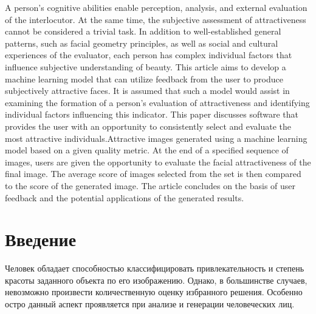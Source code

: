 \documentclass[60x84/16,8pt]{ittmm}
\begin{document}


\begin{altabstract}
A person's cognitive abilities enable perception, analysis, and external evaluation of the interlocutor.
At the same time, the subjective assessment of attractiveness cannot be considered a trivial task.
In addition to well-established general patterns, such as facial geometry principles, as well as social and cultural experiences of the evaluator,
each person has complex individual factors that influence subjective understanding of beauty.
This article aims to develop a machine learning model that can utilize feedback from the user
to produce subjectively attractive faces. It is assumed that such a model would assist in examining
the formation of a person's evaluation of attractiveness and identifying individual factors influencing
this indicator. This paper discusses software that provides the user with an opportunity to consistently
select and evaluate the most attractive individuals.Attractive images generated using a machine learning
model based on a given quality metric. At the end of a specified sequence of images, users are given the
opportunity to evaluate the facial attractiveness of the final image. The average score of images selected
from the set is then compared to the score of the generated image. The article concludes on the basis of user
feedback and the potential applications of the generated results.
\end{altabstract}


\maketitle

\section{Введение}
\label{sec:intro}

Человек обладает способностью классифицировать привлекательность и степень
красоты заданного объекта по его изображению.
Однако, в большинстве случаев, невозможно произвести количественную оценку избранного решения.
Особенно остро данный аспект проявляется при анализе и генерации человеческих лиц.
\end{document}
